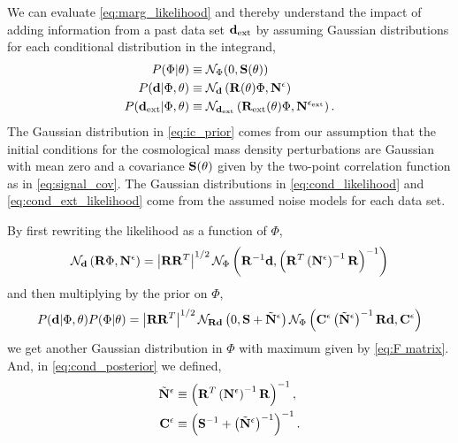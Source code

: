 \documentclass[prd, onecolumn, nofootinbib, floatfix]{revtex4-1}
\begin{document}
We can evaluate \autoref{eq:marg_likelihood} and thereby understand the impact of adding information 
from a past data set $\mathbf{d}_{\rm ext}$ by assuming Gaussian distributions for each conditional distribution 
in the integrand,
\begin{align}
	P(\Phi | \theta) &\equiv \mathcal{N}_{\Phi}(0, \mathbf{S}(\theta))
	\label{eq:ic_prior}\\
	P(\mathbf{d} | \Phi, \theta) &\equiv 
		\mathcal{N}_{\mathbf{d}} \left(\mathbf{R}(\theta)\Phi, \mathbf{N}^{\epsilon}\right)
	\label{eq:cond_likelihood}\\
	P(\mathbf{d}_{\rm ext} | \Phi, \theta) &\equiv 
		\mathcal{N}_{\mathbf{d}_{\rm ext}} \left(\mathbf{R}_{\rm ext}(\theta)\Phi, \mathbf{N}^{\epsilon_{\rm ext}}\right).
	\label{eq:cond_ext_likelihood}
\end{align}
The Gaussian distribution in \autoref{eq:ic_prior} comes from our assumption that the 
initial conditions for the cosmological mass density perturbations are Gaussian with mean zero and 
a covariance $\mathbf{S}(\theta)$ given by the two-point correlation function as in \autoref{eq:signal_cov}.
The Gaussian distributions in \autoref{eq:cond_likelihood} and \autoref{eq:cond_ext_likelihood} come from 
the assumed noise models for each data set.

By first rewriting the likelihood as a function of $\Phi$,
\begin{equation}
	\mathcal{N}_{\mathbf{d}} \left(\mathbf{R}\Phi, \mathbf{N}^{\epsilon}\right) = 
	\left|\mathbf{R}\mathbf{R}^{T}\right|^{1/2}
	\mathcal{N}_{\Phi} \left(\mathbf{R}^{-1}\mathbf{d}, \left(\mathbf{R}^{T}\left(\mathbf{N}^{\epsilon}\right)^{-1}\mathbf{R}\right)^{-1}\right)
\end{equation}
and then multiplying by the prior on $\Phi$,
\begin{equation}\label{eq:cond_posterior}
	P(\mathbf{d}|\Phi,\theta)P(\Phi|\theta) =
	\left|\mathbf{R}\mathbf{R}^{T}\right|^{1/2}
	\mathcal{N}_{\mathbf{R}\mathbf{d}} \left(0, \mathbf{S} + \tilde{\mathbf{N}}^{\epsilon}\right)
	\mathcal{N}_{\Phi} \left(\mathbf{C}^{\epsilon} \left(\tilde{\mathbf{N}}^{\epsilon}\right)^{-1} \mathbf{R} \mathbf{d}, \mathbf{C}^{\epsilon}\right)
\end{equation}
we get another Gaussian distribution in $\Phi$ with maximum given by \autoref{eq:F matrix}. 
And, in \autoref{eq:cond_posterior} we defined,
\begin{align}
	\tilde{\mathbf{N}}^{\epsilon} &\equiv \left(\mathbf{R}^{T} \left(\mathbf{N}^{\epsilon}\right)^{-1} \mathbf{R}\right)^{-1},
	\\
	\mathbf{C}^{\epsilon} &\equiv \left(\mathbf{S}^{-1} + \left(\tilde{\mathbf{N}}^{\epsilon}\right)^{-1}\right)^{-1}.
	\label{eq:cmat}
\end{align}
\end{document}
